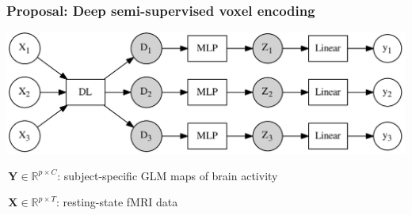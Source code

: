 \documentclass{beamer}
\def\mydot{\structure{\rule{1ex}{1ex}}\,}
\def\B#1{\mathbf{#1}}
\def\emph#1{\textbf{\textcolor{orange}{#1}}}
\begin{document}
\begin{frame}
  \frametitle{Proposal: Deep semi-supervised voxel encoding}
  \includegraphics[width=1.\linewidth]{gen_model.png}

  \bigskip
  
  \mydot $\B{Y} \in \mathbb R^{p \times C}$: subject-specific GLM maps of brain activity

  \bigskip
  
 \mydot $\B{X} \in \mathbb R^{p \times T}$: resting-state fMRI data %

 


  
  
\end{frame}
\end{document}
